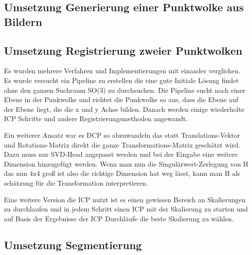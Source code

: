 \documentclass[12pt,titlepage, twoside]{article}
\begin{document}
\subsection{Umsetzung Generierung einer Punktwolke aus Bildern}
\label{sec:realisierung:implementierung1}

\subsection{Umsetzung Registrierung zweier Punktwolken}
\label{sec:realisierung:implementierung2}

Es wurden mehrere Verfahren und Implementierungen mit einander verglichen. Es wurde versucht ein Pipeline zu erstellen die eine gute Initiale Lösung findet ohne den ganzen Suchraum SO(3) zu durchsuchen.
Die Pipeline sucht nach einer Ebene in der Punkwolke und richtet die Punkwolke so aus, dass die Ebene auf der Ebene liegt, die die x und y Achse bilden. Danach werden einige wiederholte ICP Schritte und andere Registrierungsmethoden angewandt.

Ein weiterer Ansatz war es DCP so abzuwandeln das statt Translations-Vektor und Rotations-Matrix direkt die ganze Transformations-Matrix geschätzt wird. Dazu muss nur SVD-Head angepasst werden 
und bei der Eingabe eine weitere Dimension hinzugefügt werden. Wenn man nun die Singulärwert-Zerlegung von H das nun 4x4 groß ist also die richtige Dimension hat weg lässt, kann man H als schätzung für die Transformation interpretieren.

Eine weitere Version die ICP nutzt ist es einen gewissen Bereich an Skalierungen zu durchlaufen und in jedem Schritt einen ICP mit der Skalierung zu starten und auf Basis der Ergebnisse der ICP Durchläufe die beste Skalierung zu wählen. 

\subsection{Umsetzung Segmentierung}
\label{sec:realisierung:implementierung3}
\end{document}
